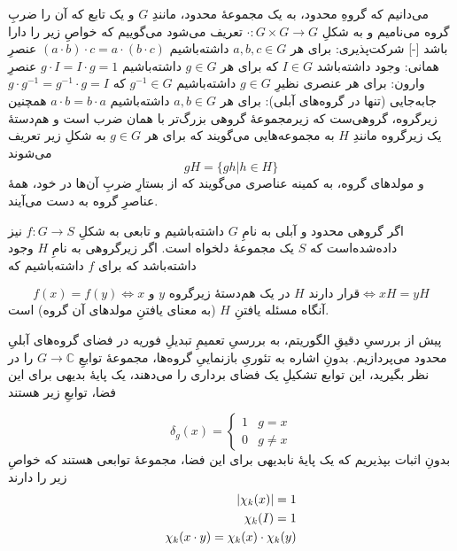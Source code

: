 می‌دانیم که گروهِ محدود، به یک مجموعهٔ محدود، مانندِ \(G\) و یک تابع که آن را ضربِ گروه می‌نامیم و به شکلِ 
\(\cdot: G \times G \to G\)
تعریف می‌شود می‌گوییم که خواصِ زیر را دارا باشد
[-]
 شرکت‌پذیری: برای هر \(a, b, c \in G\) داشته‌باشیم 
\((a \cdot b) \cdot c = a \cdot (b \cdot c)\)
 عنصرِ همانی: وجود داشته‌باشد \(I \in G\) که برای هر \(g \in G\) داشته‌باشیم
\(g \cdot I = I \cdot g = 1\)
 عنصرِ وارون: برای هر عنصری نظیرِ \(g \in G\) داشته‌باشیم 
\(g^{-1} \in G\)
که  
\(g \cdot g^{-1} = g^{-1} \cdot g = I\)
 جابه‌جایی (تنها در گروه‌های آبلی): برای هر \(a, b \in G\) داشته‌باشیم
\(a \cdot b = b \cdot a\) 
همچنین زیرگروه، گروهی‌ست که زیرمجموعهٔ گروهی بزرگ‌تر با همان ضرب است و هم‌دستهٔ یک زیرگروه مانندِ \(H\) به مجموعه‌هایی می‌گویند که برای هر \(g \in G\) به شکلِ زیر تعریف می‌شوند
\begin{equation}
    gH = \{gh | h \in H\}
\end{equation}
و مولد‌های گروه، به کمینه عناصری می‌گویند که از بستارِ ضربِ آن‌ها در خود، همهٔ عناصرِ گروه به دست می‌آیند.

اگر گروهی محدود و آبلی به نامِ \(G\) داشته‌باشیم و تابعی به شکلِ
\(f : G \to S\)
نیز داده‌شده‌است که \(S\) یک مجموعهٔ دلخواه است.
اگر زیرگروهی به نامِ \(H\) وجود داشته‌باشد که برای \(f\) داشته‌باشیم که

\begin{equation}
    f(x) = f(y) \Leftrightarrow \text{\(x\) و \(y\) در یک هم‌دستهٔ زیرگروه \(H\) قرار دارند} \Leftrightarrow xH = yH
\end{equation}
آنگاه مسئله یافتنِ \(H\) (به معنای یافتنِ مولدهای آن گروه) است.

پیش از بررسیِ دقیقِ الگوریتم، به بررسیِ تعمیمِ تبدیلِ فوریه در فضای گروه‌های آبلیِ محدود می‌پردازیم. بدونِ اشاره به تئوریِ بازنماییِ گروه‌ها، مجموعهٔ توابعِ 
\(G \to \mathbb{C}\)
را در نظر بگیرید، این توابع تشکیلِ یک فضای برداری را می‌دهند، یک پایهٔ بدیهی برای این فضا، توابعِ زیر هستند

\begin{equation}
    \delta_g(x) = \begin{cases}
    1 & g=x \\
    0 & g \ne x
    \end{cases}
\end{equation}
بدونِ اثبات بپذیریم که یک پایهٔ نابدیهی برای این فضا، مجموعهٔ توابعی هستند که خواصِ زیر را دارند 
\begin{eqnarray}
    \abs{\chi_k(x)} = 1 \\
    \chi_k(I) = 1 \\
    \chi_k(x \cdot y) = \chi_k(x) \cdot \chi_k(y) 
\end{eqnarray}

